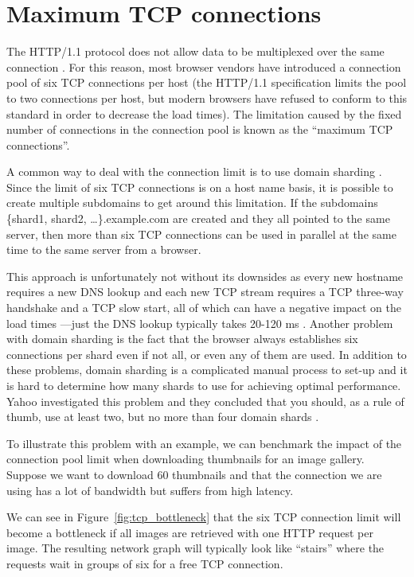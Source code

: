 \documentclass{cslthse-msc}
\begin{document}
\section{Maximum TCP connections}
\label{max_tcp}
The HTTP/1.1 protocol does not allow data to be multiplexed over the same connection \cite[p.194]{HPBN}. For this reason, most browser vendors have introduced a connection pool of six TCP connections per host (the HTTP/1.1 specification limits the pool to two connections \cite{rfc2616} per host, but modern browsers have refused to conform to this standard in order to decrease the load times). The limitation caused by the fixed number of connections in the connection pool is known as the \enquote{maximum TCP connections}.

A common way to deal with the connection limit is to use domain sharding \cite{yahoo-performance-4}	. Since the limit of six TCP connections is on a host name basis, it is possible to create multiple subdomains to get around this limitation. If the subdomains \{shard1, shard2, \ldots\}.example.com are created and they all pointed to the same server, then more than six TCP connections can be used in parallel at the same time to the same server from a browser.

This approach is unfortunately not without its downsides as every new hostname requires a new DNS lookup and each new TCP stream requires a TCP three-way handshake and a TCP slow start, all of which can have a negative impact on the load times \cite[page 199]{HPBN}---just the DNS lookup typically takes 20-120 ms \cite[page 63]{HPWS}. Another problem with domain sharding is the fact that the browser always establishes six connections per shard even if not all, or even any of them are used. In addition to these problems, domain sharding is a complicated manual process to set-up and it is hard to determine how many shards to use for achieving optimal performance. Yahoo investigated this problem and they concluded that you should, as a rule of thumb, use at least two, but no more than four domain shards \cite{yahoo-performance-4}.

To illustrate this problem with an example, we can benchmark the impact of the connection pool limit when downloading thumbnails for an image gallery. Suppose we want to download 60 thumbnails and that the connection we are using has a lot of bandwidth but suffers from high latency.

We can see in Figure~\ref{fig:tcp_bottleneck} that the six TCP connection limit will become a bottleneck if all images are retrieved with one HTTP request per image. The resulting network graph will typically look like \enquote{stairs} where the requests wait in groups of six for a free TCP connection.
\end{document}

